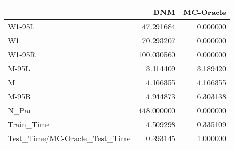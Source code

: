 \begin{tabular}{lrr}
\toprule
{} &         DNM &  MC-Oracle \\
\midrule
W1-95L                        &   47.291684 &   0.000000 \\
W1                            &   70.293207 &   0.000000 \\
W1-95R                        &  100.030560 &   0.000000 \\
M-95L                         &    3.114409 &   3.189420 \\
M                             &    4.166355 &   4.166355 \\
M-95R                         &    4.944873 &   6.303138 \\
N\_Par                         &  448.000000 &   0.000000 \\
Train\_Time                    &    4.509298 &   0.335109 \\
Test\_Time/MC-Oracle\_Test\_Time &    0.393145 &   1.000000 \\
\bottomrule
\end{tabular}
